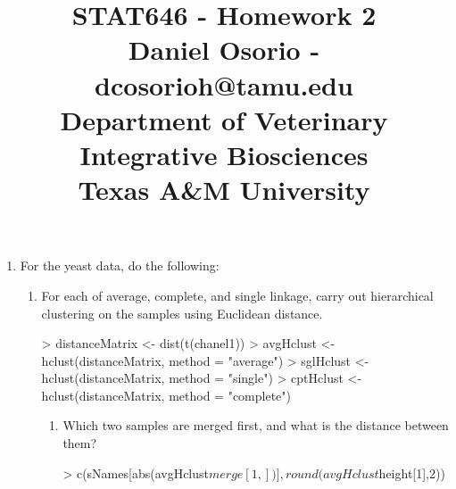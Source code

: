\documentclass[12pt,a4paper]{paper}
\begin{document}
\title{STAT646 - Homework 2\\\small{Daniel Osorio - dcosorioh@tamu.edu\\Department of Veterinary Integrative Biosciences\\Texas A\&M University}}
\maketitle

\begin{enumerate}
\item For the yeast data, do the following:
\begin{Schunk}
\end{Schunk}
\begin{enumerate}
\item For each of average, complete, and single linkage, carry out hierarchical clustering on
the samples using Euclidean distance.
\begin{Schunk}
\begin{Sinput}
> distanceMatrix <- dist(t(chanel1))
> avgHclust <- hclust(distanceMatrix, method = "average")
> sglHclust <- hclust(distanceMatrix, method = "single")
> cptHclust <- hclust(distanceMatrix, method = "complete")
\end{Sinput}
\end{Schunk}
\begin{enumerate}
\item Which two samples are merged first, and what is the distance between them?
\begin{Schunk}
\begin{Sinput}
> c(sNames[abs(avgHclust$merge[1,])], round(avgHclust$height[1],2))
\end{Sinput}
\begin{Soutput}

\end{Soutput}
\end{Schunk}
\end{enumerate}
\end{enumerate}
\end{enumerate}
\end{document}

